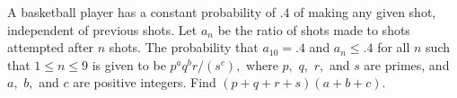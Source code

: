 A basketball player has a constant probability of $.4$ of making any given shot, independent of previous shots. Let $a_{n}$ be the ratio of shots made to shots attempted after $n$ shots. The probability that $a_{10}=.4$ and $a_{n}\le .4$ for all $n$ such that $1\le n \le 9$ is given to be $p^{a}q^{b}r/(s^{c}),$ where $p,$ $q,$ $r,$ and $s$ are primes, and $a,$ $b,$ and $c$ are positive integers. Find $(p+q+r+s)(a+b+c).$